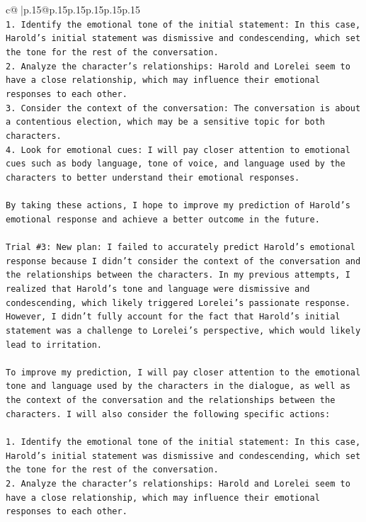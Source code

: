 \documentclass{article}
\begin{document}
{\begin{supertabular}{c@{$\;$}|p{.15\linewidth}@{}p{.15\linewidth}p{.15\linewidth}p{.15\linewidth}p{.15\linewidth}p{.15\linewidth}}
{{{\\ 
\texttt{1. Identify the emotional tone of the initial statement: In this case, Harold's initial statement was dismissive and condescending, which set the tone for the rest of the conversation.} \\
\texttt{2. Analyze the character's relationships: Harold and Lorelei seem to have a close relationship, which may influence their emotional responses to each other.} \\
\texttt{3. Consider the context of the conversation: The conversation is about a contentious election, which may be a sensitive topic for both characters.} \\
\texttt{4. Look for emotional cues: I will pay closer attention to emotional cues such as body language, tone of voice, and language used by the characters to better understand their emotional responses.} \\
\\ 
\texttt{By taking these actions, I hope to improve my prediction of Harold's emotional response and achieve a better outcome in the future.} \\
\\ 
\texttt{Trial \#3: New plan: I failed to accurately predict Harold's emotional response because I didn't consider the context of the conversation and the relationships between the characters. In my previous attempts, I realized that Harold's tone and language were dismissive and condescending, which likely triggered Lorelei's passionate response. However, I didn't fully account for the fact that Harold's initial statement was a challenge to Lorelei's perspective, which would likely lead to irritation.} \\
\\ 
\texttt{To improve my prediction, I will pay closer attention to the emotional tone and language used by the characters in the dialogue, as well as the context of the conversation and the relationships between the characters. I will also consider the following specific actions:} \\
\\ 
\texttt{1. Identify the emotional tone of the initial statement: In this case, Harold's initial statement was dismissive and condescending, which set the tone for the rest of the conversation.} \\
\texttt{2. Analyze the character's relationships: Harold and Lorelei seem to have a close relationship, which may influence their emotional responses to each other.} \\
}}}
\end{supertabular}}
\end{document}
